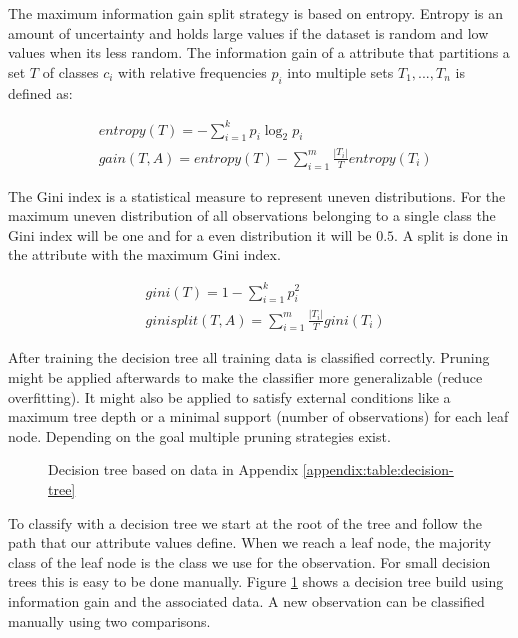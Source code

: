 \documentclass[pdftex,12pt,a4paper]{report}
\begin{document}
The maximum information gain split strategy is based on entropy. Entropy is an amount of uncertainty and holds large values if the dataset is random and low values when its less random. The information gain of a attribute that partitions a set $T$ of classes $c_i$ with relative frequencies $p_i$ into multiple sets $T_1, ..., T_n$ is defined as:

\begin{equation}
\begin{split}
	& entropy(T) = - \sum_{i=1}^{k} p_i \log_2 p_i \\	
	& gain(T,A) = entropy(T) - \sum_{i=1}^{m} \frac{|T_i|}{T} entropy(T_i)
\end{split}
\end{equation}

The Gini index is a statistical measure to represent uneven distributions. For the maximum uneven distribution of all observations belonging to a single class the Gini index will be one and for a even distribution it will be $0.5$. A split is done in the attribute with the maximum Gini index.

\begin{equation}
\begin{split}
& gini(T) = 1 - \sum_{i=1}^{k} p_i^2 \\
& ginisplit(T,A) = \sum_{i=1}^{m} \frac{|T_i|}{T} gini(T_i) 
\end{split}
\end{equation}

After training the decision tree all training data is classified correctly. Pruning might be applied afterwards to make the classifier more generalizable (reduce overfitting). It might also be applied to satisfy external conditions like a maximum tree depth or a minimal support (number of observations) for each leaf node. Depending on the goal multiple pruning strategies exist.

\begin{figure}[h]
	\centering
	\begin{subfigure}[b]{0.65\textwidth}
		\centering
		
	\end{subfigure}
	\caption{Decision tree based on data in Appendix \ref{appendix:table:decision-tree}}
	\label{fig:basics-decision-tree}
\end{figure}

To classify with a decision tree we start at the root of the tree and follow the path that our attribute values define. When we reach a leaf node, the majority class of the leaf node is the class we use for the observation. For small decision trees this is easy to be done manually. Figure \ref{fig:basics-decision-tree} shows a decision tree build using information gain and the associated data. A new observation can be classified manually using two comparisons.
\end{document}

